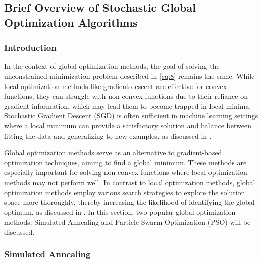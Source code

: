 \subsection{Brief Overview of Stochastic Global Optimization Algorithms}
\subsubsection{Introduction}
In the context of global optimization methods, the goal of solving the unconstrained minimization problem described in \ref{eq:8} remains the same. While local optimization methods like gradient descent are effective for convex functions, they can struggle with non-convex functions due to their reliance on gradient information, which may lead them to become trapped in local minima. Stochastic Gradient Descent (SGD) is often sufficient in machine learning settings where a local minimum can provide a satisfactory solution and balance between fitting the data and generalizing to new examples, as discussed in \cite[282-290]{Goodfellow-et-al-2016}.

Global optimization methods serve as an alternative to gradient-based optimization techniques, aiming to find a global minimum. These methods are especially important for solving non-convex functions where local optimization methods may not perform well. In contrast to local optimization methods, global optimization methods employ various search strategies to explore the solution space more thoroughly, thereby increasing the likelihood of identifying the global optimum, as discussed in \cite[1-5]{horst1995handbook}. In this section, two popular global optimization methods: Simulated Annealing and Particle Swarm Optimization (PSO) will be discussed.

\subsubsection{Simulated Annealing}
